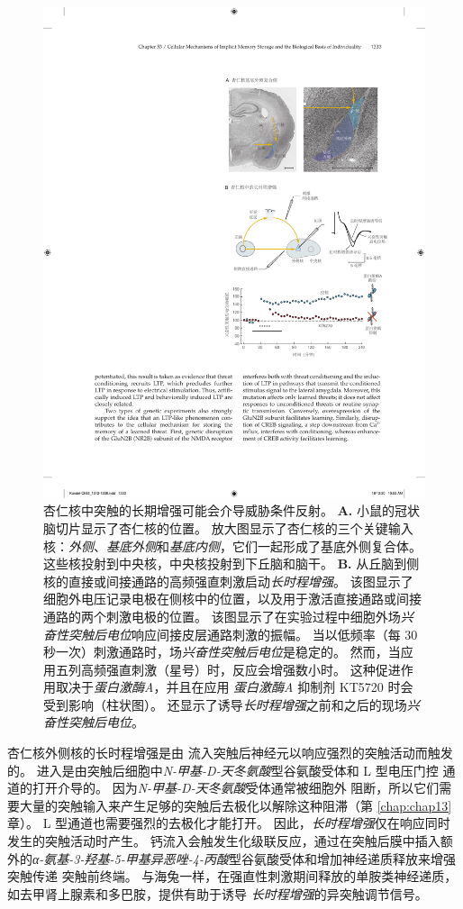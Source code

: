 \begin{figure}[htbp]
	\centering
	\includegraphics[width=0.7\linewidth]{chap53/fig_53_15}
	\caption{杏仁核中突触的长期增强可能会介导威胁条件反射。
		\textbf{A.} 小鼠的冠状脑切片显示了杏仁核的位置。
		放大图显示了杏仁核的三个关键输入核：\textit{外侧}、\textit{基底外侧}和\textit{基底内侧}，它们一起形成了基底外侧复合体。
		这些核投射到中央核，中央核投射到下丘脑和脑干\cite{maren1999long}。
		\textbf{B.} 从丘脑到侧核的直接或间接通路的高频强直刺激启动\textit{长时程增强}。
		该图显示了细胞外电压记录电极在侧核中的位置，以及用于激活直接通路或间接通路的两个刺激电极的位置。
		该图显示了在实验过程中细胞外场\textit{兴奋性突触后电位}响应间接皮层通路刺激的振幅。
		当以低频率（每 30 秒一次）刺激通路时，场\textit{兴奋性突触后电位}是稳定的。
		然而，当应用五列高频强直刺激（星号）时，反应会增强数小时。
		这种促进作用取决于\textit{蛋白激酶A}，并且在应用 \textit{蛋白激酶A} 抑制剂 KT5720 时会受到影响（柱状图）。 还显示了诱导\textit{长时程增强}之前和之后的现场\textit{兴奋性突触后电位}\cite{huang1998postsynaptic,huang2000both}。}
	\label{fig:53_15}
\end{figure}


杏仁核外侧核的长时程增强是由  流入突触后神经元以响应强烈的突触活动而触发的。
 进入是由突触后细胞中\textit{N-甲基-D-天冬氨酸}型谷氨酸受体和 L 型电压门控  通道的打开介导的。
因为\textit{N-甲基-D-天冬氨酸}受体通常被细胞外  阻断，所以它们需要大量的突触输入来产生足够的突触后去极化以解除这种阻滞（第 \ref{chap:chap13} 章）。
L 型通道也需要强烈的去极化才能打开。 因此，\textit{长时程增强}仅在响应同时发生的突触活动时产生。
钙流入会触发生化级联反应，通过在突触后膜中插入额外的\textit{α-氨基-3-羟基-5-甲基异恶唑-4-丙酸}型谷氨酸受体和增加神经递质释放来增强突触传递 突触前终端。
与海兔一样，在强直性刺激期间释放的单胺类神经递质，如去甲肾上腺素和多巴胺，提供有助于诱导 \textit{长时程增强}的异突触调节信号。


